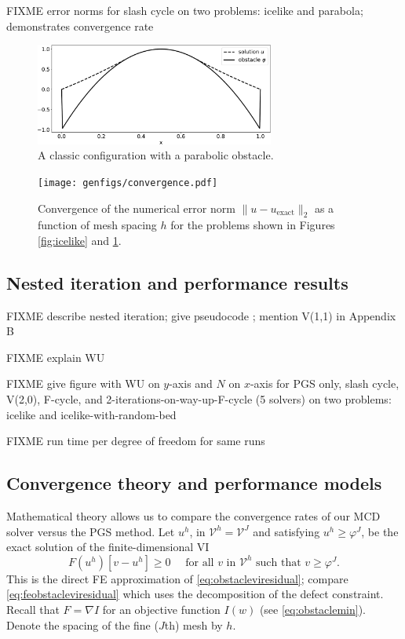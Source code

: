 \documentclass[letterpaper,final,12pt,reqno]{amsart}
\theoremstyle{claim}
\newcommand{\grad}{\nabla}
\numberwithin{equation}{section}
\numberwithin{figure}{section}
\numberwithin{table}{section}
\numberwithin{theorem}{section}
\begin{document}
FIXME error norms for slash cycle on two problems: icelike and parabola; demonstrates convergence rate

\begin{figure}
\includegraphics[width=0.7\textwidth]{fixfigs/parabola.pdf}
\caption{A classic configuration with a parabolic obstacle.}
\label{fig:parabola}
\end{figure}

\begin{figure}
\texttt{[image: genfigs/convergence.pdf]}
\caption{Convergence of the numerical error norm $\|u-u_{\text{exact}}\|_2$ as a function of mesh spacing $h$ for the problems shown in Figures \ref{fig:icelike} and \ref{fig:parabola}.}
\label{fig:convergence}
\end{figure}


\subsection*{Nested iteration and performance results} FIXME describe nested iteration; give pseudocode ; mention V(1,1) in Appendix B

FIXME explain WU

FIXME give figure with WU on $y$-axis and $N$ on $x$-axis for PGS only, slash cycle, V(2,0), F-cycle, and 2-iterations-on-way-up-F-cycle (5 solvers) on two problems: icelike and icelike-with-random-bed

FIXME run time per degree of freedom for same runs

\subsection*{Convergence theory and performance models}  Mathematical theory allows us to compare the convergence rates of our MCD solver versus the PGS method.  Let $u^h$, in $\mathcal{V}^h = \mathcal{V}^J$ and satisfying $u^h \ge \varphi^J$, be the exact solution of the finite-dimensional VI
\begin{equation}
  F(u^h)[v-u^h] \ge 0 \quad \text{ for all } v \text{ in $\mathcal{V}^h$ such that } v \ge \varphi^J. \label{eq:feobstaclevioriginal}
\end{equation}
This is the direct FE approximation of \eqref{eq:obstacleviresidual}; compare \eqref{eq:feobstacleviresidual} which uses the decomposition of the defect constraint.  Recall that $F=\grad I$ for an objective function $I(w)$ (see \eqref{eq:obstaclemin}).  Denote the spacing of the fine ($J$th) mesh by $h$.
\end{document}
